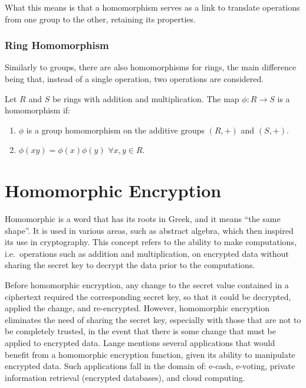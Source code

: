 What this means is that a homomorphism serves as a link to translate operations from one group to the other, retaining its properties.

\subsubsection{Ring Homomorphism}

Similarly to groups, there are also homomorphisms for rings, the main difference being that, instead of a single operation, two operations are considered.

Let $R$ and $S$ be rings with addition and multiplication. The map $\phi: R \rightarrow S$ is a homomorphism if:
\begin{enumerate}
\item $\phi$ is a group homomorphism on the additive groups $(R, +)$ and $(S,+)$.
\item $\phi(xy) = \phi(x) \phi(y)$ $\forall x, y \in R$.
\end{enumerate}

\section{Homomorphic Encryption}

Homomorphic is a word that has its roots in Greek, and it means ``the same shape''. It is used in various areas, such as abstract algebra, which then inspired its use in cryptography. This concept refers to the ability to make computations, i.e.\ operations such as addition and multiplication, on encrypted data without sharing the secret key to decrypt the data prior to the computations. 

Before homomorphic encryption, any change to the secret value contained in a ciphertext required the corresponding secret key, so that it could be decrypted, applied the change, and re-encrypted. However, homomorphic encryption eliminates the need of sharing the secret key, especially with those that are not to be completely trusted, in the event that there is some change that must be applied to encrypted data. 
Lange \cite{lange2011} mentions several applications that would benefit from a homomorphic encryption function, given its ability to manipulate encrypted data. Such applications fall in the domain of: e-cash, e-voting, private information retrieval (encrypted databases), and cloud computing.

